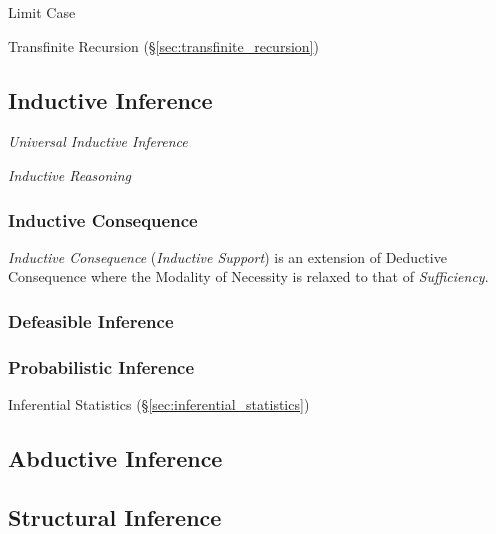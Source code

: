 Limit Case

Transfinite Recursion (\S\ref{sec:transfinite_recursion})



\subsection{Inductive Inference}\label{sec:inductive_inference}
\cite{hawthorne08}

\emph{Universal Inductive Inference}

\emph{Inductive Reasoning}



\subsubsection{Inductive Consequence}\label{sec:inductive_consequence}

\emph{Inductive Consequence} (\emph{Inductive Support}) is an
extension of Deductive Consequence where the Modality of Necessity is
relaxed to that of \emph{Sufficiency}.



\subsubsection{Defeasible Inference}\label{sec:defeasible_inference}

\subsubsection{Probabilistic Inference}\label{sec:probabilistic_inference}

Inferential Statistics (\S\ref{sec:inferential_statistics})



\subsection{Abductive Inference}\label{sec:abductive_inference}

\subsection{Structural Inference}\label{sec:structural_inference}

